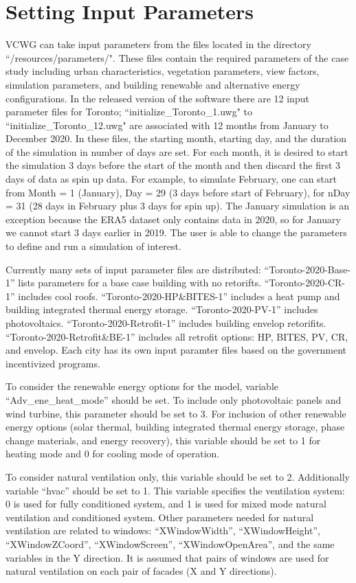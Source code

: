 \documentclass[12pt]{article}
\begin{document}
\section{Setting Input Parameters}

VCWG can take input parameters from the files located in the directory ``/resources/parameters/". These files contain the required parameters of the case study including urban characteristics, vegetation parameters, view factors, simulation parameters, and building renewable and alternative energy configurations. In the released version of the software there are 12 input parameter files for Toronto; ``initialize\_Toronto\_1.uwg" to ``initialize\_Toronto\_12.uwg" are associated with 12 months from January to December 2020. In these files, the starting month, starting day, and the duration of the simulation in number of days are set. For each month, it is desired to start the simulation 3 days before the start of the month and then discard the first 3 days of data as spin up data. For example, to simulate February, one can start from Month = 1 (January), Day = 29 (3 days before start of February), for nDay = 31 (28 days in February plus 3 days for spin up). The January simulation is an exception because the ERA5 dataset only contains data in 2020, so for January we cannot start 3 days earlier in 2019. The user is able to change the parameters to define and run a simulation of interest. 

Currently many sets of input parameter files are distributed: ``Toronto-2020-Base-1'' lists parameters for a base case building with no retorifts. ``Toronto-2020-CR-1'' includes cool roofs. ``Toronto-2020-HP\&BITES-1'' includes a heat pump and building integrated thermal energy storage. ``Toronto-2020-PV-1'' includes photovoltaics. ``Toronto-2020-Retrofit-1'' includes building envelop retorifits. ``Toronto-2020-Retrofit\&BE-1'' includes all retrofit options: HP, BITES, PV, CR, and envelop. Each city has its own input paramter files based on the government incentivized programs.

To consider the renewable energy options for the model, variable ``Adv\_ene\_heat\_mode'' should be set. To include only photovoltaic panels and wind turbine, this parameter should be set to 3. For inclusion of other renewable energy options (solar thermal, building integrated thermal energy storage, phase change materials, and energy recovery), this variable should be set to 1 for heating mode and 0 for cooling mode of operation. 

To consider natural ventilation only, this variable should be set to 2. Additionally variable ``hvac'' should be set to 1. This variable specifies the ventilation system: 0 is used for fully conditioned system, and 1 is used for mixed mode natural ventilation and conditioned system. Other parameters needed for natural ventilation are related to windows: ``XWindowWidth'', ``XWindowHeight'', ``XWindowZCoord'', ``XWindowScreen'', ``XWindowOpenArea'', and the same variables in the Y direction. It is assumed that pairs of windows are used for natural ventilation on each pair of facades (X and Y directions).
\end{document}
